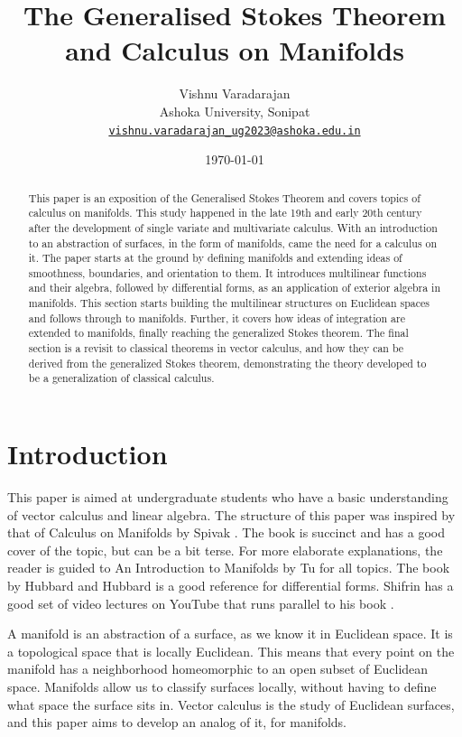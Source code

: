 \documentclass{article}
\title{\textbf{The Generalised Stokes Theorem and Calculus on Manifolds}}
\author{Vishnu Varadarajan
\\
Ashoka University, Sonipat\\
\href{mailto:vishnu.varadarajan\_ug2023@ashoka.edu.in}{\tt vishnu.varadarajan\_ug2023@ashoka.edu.in}}
\date{\today}
\begin{document}
\maketitle

\begin{abstract}
This paper is an exposition of the Generalised Stokes Theorem and covers topics of calculus on manifolds. This study happened in the late 19th and early 20th century after the development of single variate and multivariate calculus. With an introduction to an abstraction of surfaces, in the form of manifolds, came the need for a calculus on it. The paper starts at the ground by defining manifolds and extending ideas of smoothness, boundaries, and orientation to them. It introduces multilinear functions and their algebra, followed by differential forms, as an application of exterior algebra in manifolds. This section starts building the multilinear structures on Euclidean spaces and follows through to manifolds. Further, it covers how ideas of integration are extended to manifolds, finally reaching the generalized Stokes theorem. The final section is a revisit to classical theorems in vector calculus, and how they can be derived from the generalized Stokes theorem, demonstrating the theory developed to be a generalization of classical calculus.
\end{abstract}

\tableofcontents

\section{Introduction}
This paper is aimed at undergraduate students who have a basic understanding of vector calculus and linear algebra. The structure of this paper was inspired by that of Calculus on Manifolds by Spivak \cite{spivak1971calculus}. The book is succinct and has a good cover of the topic, but can be a bit terse. For more elaborate explanations, the reader is guided to An Introduction to Manifolds by Tu \cite{tu2010introduction} for all topics. The book by Hubbard and Hubbard \cite{hubbard2009vector} is a good reference for differential forms. Shifrin has a good set of video lectures on YouTube \cite{formsplaylist} that runs parallel to his book \cite{shifrin2004multivariable}.

A manifold is an abstraction of a surface, as we know it in Euclidean space. It is a topological space that is locally Euclidean. This means that every point on the manifold has a neighborhood homeomorphic to an open subset of Euclidean space. Manifolds allow us to classify surfaces locally, without having to define what space the surface sits in. Vector calculus is the study of Euclidean surfaces, and this paper aims to develop an analog of it, for manifolds.
\end{document}
